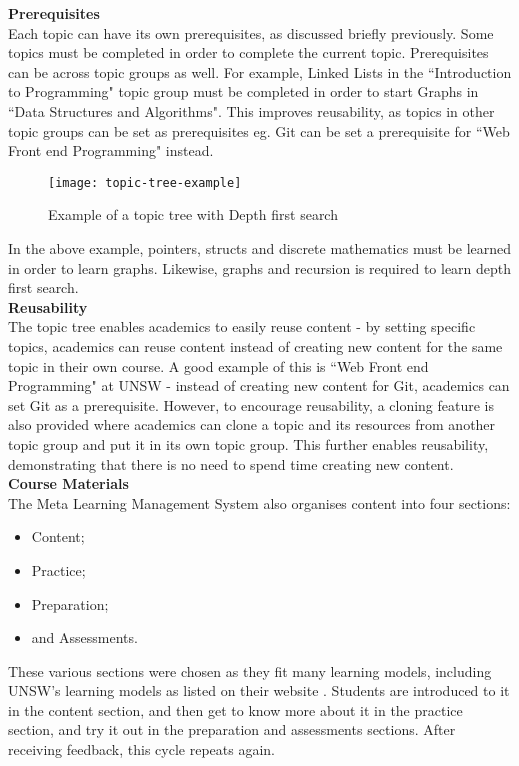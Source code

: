 \textbf{Prerequisites} \\

Each topic can have its own prerequisites, as discussed briefly previously. Some topics must be completed in order to complete the current topic. Prerequisites can be across topic groups as well. For example, Linked Lists in the ``Introduction to Programming" topic group must be completed in order to start Graphs in ``Data Structures and Algorithms". This improves reusability, as topics in other topic groups can be set as prerequisites eg. Git can be set a prerequisite for ``Web Front end Programming" instead.

\begin{figure}[h!]
    \centering
    \texttt{[image: topic-tree-example]}
    \caption{Example of a topic tree with Depth first search}
\end{figure}

In the above example, pointers, structs and discrete mathematics must be learned in order to learn graphs. Likewise, graphs and recursion is required to learn depth first search.\\

\textbf{Reusability} \\
The topic tree enables academics to easily reuse content - by setting specific topics, academics can reuse content instead of creating new content for the same topic in their own course. A good example of this is ``Web Front end Programming" at UNSW - instead of creating new content for Git, academics can set Git as a prerequisite. However, to encourage reusability, a cloning feature is also provided where academics can clone a topic and its resources from another topic group and put it in its own topic group. This further enables reusability, demonstrating that there is no need to spend time creating new content.\\

\textbf{Course Materials} \\
The Meta Learning Management System also organises content into four sections:
\begin{itemize}
    \item Content;
    \item Practice;
    \item Preparation;
    \item and Assessments.
\end{itemize}

These various sections were chosen as they fit many learning models, including UNSW's learning models as listed on their website \cite{learningModel}. Students are introduced to it in the content section, and then get to know more about it in the practice section, and try it out in the preparation and assessments sections. After receiving feedback, this cycle repeats again.\\

